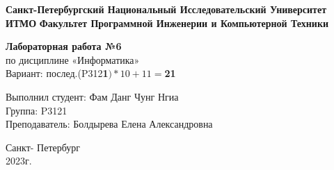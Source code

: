 \pagestyle{empty} %
\begin{center}
    \textbf{Санкт-Петербургский Национальный Исследовательский Университет ИТМО}
    \vspace{1em} %
    \textbf{Факультет Программной Инженерии и Компьютерной Техники}
    \vspace{12em}
    
    {\large\textbf{Лабораторная работа №6} }\\ %
    \vspace{1em}    %
    по дисциплине «Информатика»\\[1em]
    Вариант: послед.(P312\textbf{1}$)*10+11=$\textbf{21}
\end{center}
\vspace{13em}
\begin{flushright}
    Выполнил студент: Фам Данг Чунг Нгиа\\
    Группа: P3121\\
    Преподаватель: Болдырева Елена Александровна
\end{flushright}
\vspace{10em}
\begin{center}
    Санкт- Петербург\\
    2023г.
\end{center}